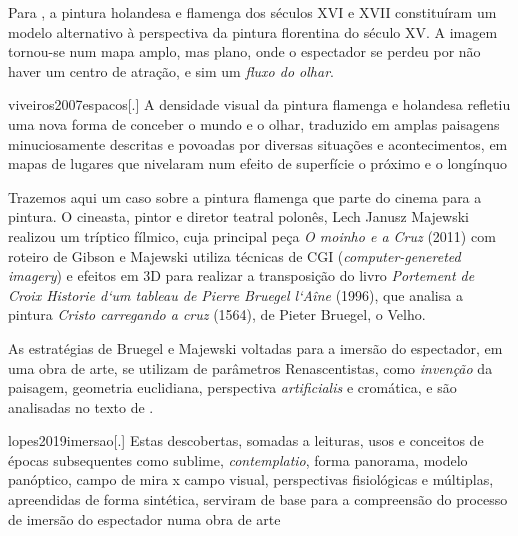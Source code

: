 Para \textcite{viveiros2007espacos}, a pintura holandesa e flamenga dos
séculos XVI e XVII constituíram um modelo alternativo à perspectiva da
pintura florentina do século XV. A imagem tornou-se num mapa amplo, mas
plano, onde o espectador se perdeu por não haver um centro de atração,
e sim um \emph{fluxo do olhar}. \parencite{viveiros2007espacos}

\begin{displaycquote}[38]{viveiros2007espacos}[.]
	A densidade visual da pintura flamenga e holandesa refletiu uma nova
	forma de conceber o mundo e o olhar, traduzido em amplas paisagens
	minuciosamente descritas e povoadas por diversas situações e
	acontecimentos, em mapas de lugares que nivelaram num efeito de
	superfície o próximo e o longínquo
\end{displaycquote}

Trazemos aqui um caso sobre a pintura flamenga que parte do cinema para
a pintura. O cineasta, pintor e diretor teatral polonês, Lech Janusz
Majewski realizou um tríptico fílmico, cuja principal peça \emph{O
	moinho e a Cruz} (2011) com roteiro de Gibson e Majewski utiliza
técnicas de CGI (\emph{computer-genereted imagery}) e efeitos em 3D
para realizar a transposição do livro \emph{Portement de Croix Historie
	d`um tableau de Pierre Bruegel l`Aîne} (1996), que analisa a pintura
\emph{Cristo carregando a cruz} (1564), de Pieter Bruegel, o Velho.

As estratégias de Bruegel e Majewski voltadas para a imersão do
espectador, em uma obra de arte, se utilizam de parâmetros
Renascentistas, como \emph{invenção} da paisagem, geometria euclidiana,
perspectiva \emph{artificialis} e cromática, e são analisadas no texto
de \textcite{lopes2019imersao}.

\begin{displayquote}{lopes2019imersao}[.]
	Estas descobertas, somadas a leituras, usos e conceitos de épocas
	subsequentes como sublime, \emph{contemplatio}, forma panorama, modelo
	panóptico, campo de mira x campo visual, perspectivas fisiológicas e
	múltiplas, apreendidas de forma sintética, serviram de base para a
	compreensão do processo de imersão do espectador numa obra de arte
\end{displayquote}

